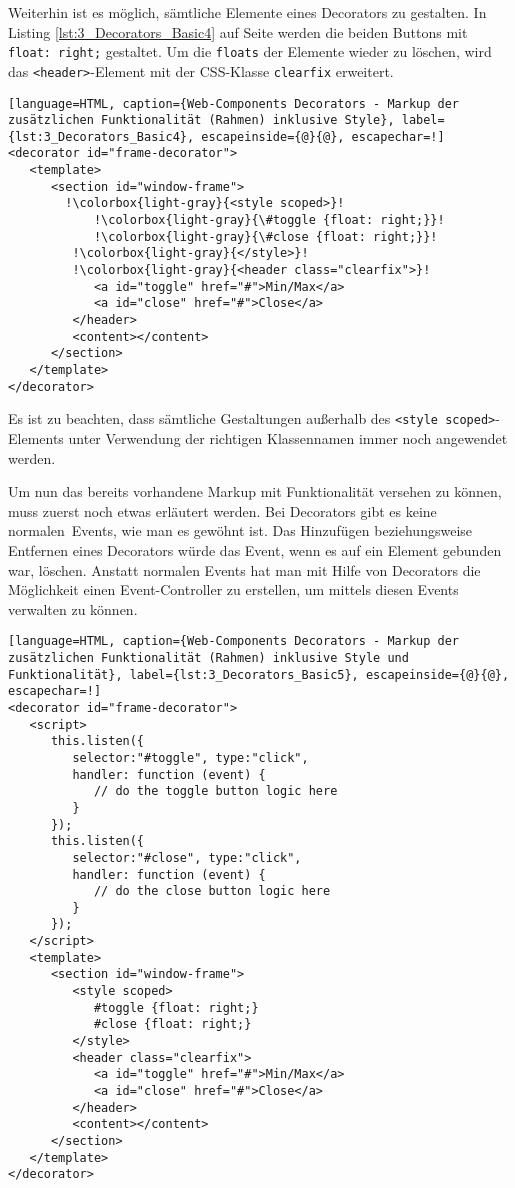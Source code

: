 Weiterhin ist es möglich, sämtliche Elemente eines Decorators zu gestalten. In Listing \ref{lst:3_Decorators_Basic4} auf Seite \pageref{lst:3_Decorators_Basic4} werden die beiden Buttons mit \lstinline|float: right;| gestaltet. Um die \lstinline|floats| der Elemente wieder zu löschen, wird das \lstinline|<header>|-Element mit der CSS-Klasse \lstinline|clearfix| erweitert.

\begin{lstlisting}[language=HTML, caption={Web-Components Decorators - Markup der zusätzlichen Funktionalität (Rahmen) inklusive Style}, label={lst:3_Decorators_Basic4}, escapeinside={@}{@}, escapechar=!]
<decorator id="frame-decorator">
   <template>
      <section id="window-frame">
        !\colorbox{light-gray}{<style scoped>}!
            !\colorbox{light-gray}{\#toggle {float: right;}}!
            !\colorbox{light-gray}{\#close {float: right;}}!
         !\colorbox{light-gray}{</style>}!
         !\colorbox{light-gray}{<header class="clearfix">}!
            <a id="toggle" href="#">Min/Max</a>
            <a id="close" href="#">Close</a>
         </header>
         <content></content>
      </section>
   </template>
</decorator>
\end{lstlisting}

Es ist zu beachten, dass sämtliche Gestaltungen außerhalb des \lstinline|<style scoped>|-Elements unter Verwendung der richtigen Klassennamen immer noch angewendet werden.

Um nun das bereits vorhandene Markup mit Funktionalität versehen zu können, muss zuerst noch etwas erläutert werden. Bei Decorators gibt es keine \glqq normalen\grqq\ Events, wie man es gewöhnt ist. Das Hinzufügen beziehungsweise Entfernen eines Decorators würde das Event, wenn es auf ein Element gebunden war, löschen. Anstatt normalen Events hat man mit Hilfe von Decorators die Möglichkeit einen Event-Controller zu erstellen, um mittels diesen Events verwalten zu können.

\begin{lstlisting}[language=HTML, caption={Web-Components Decorators - Markup der zusätzlichen Funktionalität (Rahmen) inklusive Style und Funktionalität}, label={lst:3_Decorators_Basic5}, escapeinside={@}{@}, escapechar=!]
<decorator id="frame-decorator">
   <script>
      this.listen({
         selector:"#toggle", type:"click",
         handler: function (event) {
            // do the toggle button logic here
         }
      });
      this.listen({
         selector:"#close", type:"click",
         handler: function (event) {
            // do the close button logic here
         }
      });
   </script>
   <template>
      <section id="window-frame">
         <style scoped>
            #toggle {float: right;}
            #close {float: right;}
         </style>
         <header class="clearfix">
            <a id="toggle" href="#">Min/Max</a>
            <a id="close" href="#">Close</a>
         </header>
         <content></content>
      </section>
   </template>
</decorator>
\end{lstlisting}


